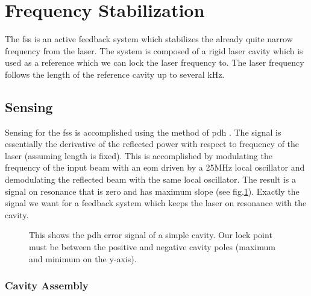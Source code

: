 \section{Frequency Stabilization}
\label{sec:fss}

The \ac{fss} is an active feedback system which stabilizes the already quite
narrow frequency from the laser. The system is composed of a rigid laser cavity
which is used as a reference which we can lock the laser frequency to. The
laser frequency follows the length of the reference cavity up to several kHz.

\subsection{Sensing}

Sensing for the \ac{fss} is accomplished using the method of \ac{pdh}
\cite{Black:2001}.
The signal is essentially the derivative of the reflected power with respect
to frequency of the laser (assuming length is fixed).
This is accomplished by modulating the frequency of the input beam with an
\ac{eom} driven by a 25MHz local oscillator and demodulating the reflected
beam with the same local oscillator.
The result is a signal on resonance that is zero and has maximum slope
(see fig.\ref{fig:pdh}).
Exactly the signal we want for a feedback system which keeps the laser on
resonance with the cavity. 

\begin{figure}
\centering
{}
\caption[PDH Error Signal]{This shows the \ac{pdh} error signal of a simple
  cavity.
  Our lock point must be between the positive and negative cavity poles
  (maximum  and minimum on the y-axis).
  }
\label{fig:pdh}
\end{figure}

\subsubsection{Cavity Assembly}

